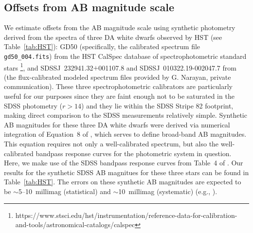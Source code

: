\documentclass[fleqn,usenatbib]{mnras}
\begin{document}


\subsection{Offsets from AB magnitude scale \label{sec:AB}} 

We estimate offsets from the AB magnitude scale using synthetic photometry derived from the spectra of three DA white dwarfs observed by HST (see Table~\ref{tab:HST}): GD50 (specifically, the calibrated spectrum file {\tt gd50\_004.fits}) from the HST CalSpec database of spectrophotometric standard stars \citep{2014PASP..126..711B}\footnote{https://www.stsci.edu/hst/instrumentation/reference-data-for-calibration-and-tools/astronomical-catalogs/calspec}, and SDSSJ~232941.32$+$001107.8 and SDSSJ~010322.19-002047.7 from \citet{2019ApJS..241...20N}
(the flux-calibrated modeled spectrum files provided by G. Narayan, private communication).  These three spectrophotometric calibrators are particularly useful for our purposes since they are faint enough not to be saturated in the SDSS photometry ($r>14$) and they lie within the SDSS Stripe 82 footprint, making direct comparison to the SDSS measurements relatively simple.  Synthetic AB magnitudes for these three DA white dwarfs were derived via numerical integration of Equation~8 of \citet{1996AJ....111.1748F}, which serves to define broad-band AB magnitudes.  This equation requires not only a well-calibrated spectrum, but also the well-calibrated bandpass response curves for the photometric system in question.  Here, we make use of the SDSS bandpass response curves from Table~4 of \citet{2010AJ....139.1628D}.  Our results for the synthetic SDSS AB magnitues for these three stars can be found in Table~\ref{tab:HST}.  The errors on these synthetic AB magnitudes are expected to be $\sim$5--10~millimag (statistical) and $\sim$10~millimag (systematic) (e.g., \citet{2014PASP..126..711B}).  
\end{document}
